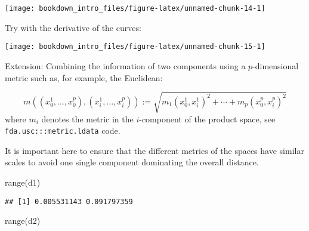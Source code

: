 \documentclass[
]{book}
\newenvironment{Shaded}{\begin{snugshade}}{\end{snugshade}}
\newcommand{\AttributeTok}[1]{\textcolor[rgb]{0.77,0.63,0.00}{#1}}
\newcommand{\DecValTok}[1]{\textcolor[rgb]{0.00,0.00,0.81}{#1}}
\newcommand{\FunctionTok}[1]{\textcolor[rgb]{0.00,0.00,0.00}{#1}}
\newcommand{\NormalTok}[1]{#1}
\newcommand{\OtherTok}[1]{\textcolor[rgb]{0.56,0.35,0.01}{#1}}
\newcommand{\SpecialCharTok}[1]{\textcolor[rgb]{0.00,0.00,0.00}{#1}}
\newcommand{\StringTok}[1]{\textcolor[rgb]{0.31,0.60,0.02}{#1}}
\begin{document}
\begin{Shaded}
\end{Shaded}

\begin{center}\texttt{[image: bookdown\_intro\_files/figure-latex/unnamed-chunk-14-1]} \end{center}

Try with the derivative of the curves:

\begin{center}\texttt{[image: bookdown\_intro\_files/figure-latex/unnamed-chunk-15-1]} \end{center}

Extension: Combining the information of two components using a \(p\)-dimensional metric such as, for example, the Euclidean:

\[m\left(\left(x_0^1,\ldots,x_0^p\right),\left(x_i^1,\ldots,x_i^p\right)\right):=\sqrt{m_1\left(x_0^1,x_i^1\right)^2+\cdots+m_p\left(x_0^p,x_i^p\right)^2}\]
where \(m_{i}\) denotes the metric in the \(i\)-component of the product space, see \texttt{fda.usc:::metric.ldata} code.

It is important here to ensure that the different metrics of the spaces have similar scales to avoid one single component dominating the overall distance.

\begin{Shaded}
\begin{Highlighting}[]
\FunctionTok{range}\NormalTok{(d1)}
\end{Highlighting}
\end{Shaded}

\begin{verbatim}
## [1] 0.005531143 0.091797359
\end{verbatim}

\begin{Shaded}
\begin{Highlighting}[]
\FunctionTok{range}\NormalTok{(d2)}
\end{Highlighting}
\end{Shaded}
\end{document}
